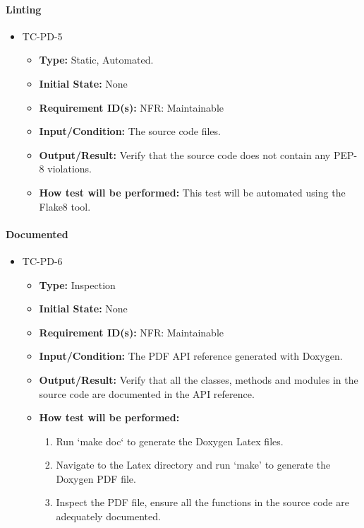\documentclass[12pt, titlepage]{article}
\begin{document}
\paragraph{Linting}

\begin{itemize}
\item{TC-PD-5\\}
\begin{itemize}

\item{\textbf{Type:}} Static, Automated.
					
\item{\textbf{Initial State:}} None

\item{\textbf{Requirement ID(s):}} NFR: Maintainable
					
\item{\textbf{Input/Condition:}}  The source code files.
					
\item{\textbf{Output/Result:}} Verify that the source code does not contain any PEP-8 violations.

\item{\textbf{How test will be performed:}}   This test will be automated using the 
Flake8 \cite{Flake8} tool.

\end{itemize}
\end{itemize}

\paragraph{Documented}
\begin{itemize}
\item{TC-PD-6\\}
\begin{itemize}
\item{\textbf{Type:}} Inspection
					
\item{\textbf{Initial State:}} None

\item{\textbf{Requirement ID(s):}} NFR: Maintainable
					
\item{\textbf{Input/Condition:}}  The PDF API reference generated with Doxygen.
					
\item{\textbf{Output/Result:}} Verify that all the classes, methods and modules in the source
code are documented in the API reference.

\item{\textbf{How test will be performed:}}  
\begin{enumerate}
\item Run `make doc` to generate the Doxygen Latex files.
\item Navigate to the Latex directory and run `make' to generate the Doxygen PDF file.
\item Inspect the PDF file, ensure all the functions in the source code are adequately documented. 
\end {enumerate}
\end{itemize}
\end{itemize}
\end{document}
